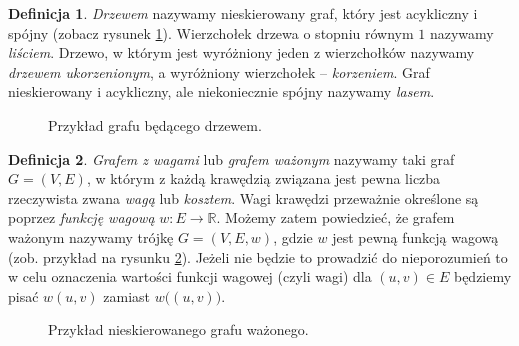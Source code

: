 \documentclass[12pt,a4paper]{book}
\theoremstyle{definition}
\newtheorem{de}{Definicja}[chapter]
\newcommand{\bR}{{\mathbb R}}
\numberwithin{equation}{chapter}
\begin{document}
\begin{de}
\textit{Drzewem} nazywamy nieskierowany graf, który jest acykliczny i spójny (zobacz rysunek \ref{rys_drzewo}). 
Wierzchołek drzewa o stopniu równym $1$ nazywamy \textit{liściem}. Drzewo, w którym jest wyróżniony jeden z wierzchołków nazywamy \textit{drzewem ukorzenionym}, a wyróżniony wierzchołek – \textit{korzeniem}. Graf nieskierowany i acykliczny, ale niekoniecznie spójny nazywamy \textit{lasem}.
\end{de}

\begin{figure}[H]
\centering
{}
\caption{Przykład grafu będącego drzewem.}
\label{rys_drzewo}
\end{figure}

\begin{de}
\textit{Grafem z wagami} lub \textit{grafem ważonym} nazywamy taki graf $G=(V, E)$, w którym z każdą krawędzią związana jest pewna liczba rzeczywista zwana \textit{wagą} lub \textit{kosztem}. Wagi krawędzi przeważnie określone są poprzez \textit{funkcję wagową} $w\colon E\to \bR$. Możemy zatem powiedzieć, że grafem ważonym nazywamy trójkę $G = (V, E, w)$, gdzie $w$ jest pewną funkcją wagową (zob. przykład na rysunku \ref{rys_graf_wa}). Jeżeli nie będzie to prowadzić do nieporozumień to w celu oznaczenia wartości funkcji wagowej (czyli wagi) dla $(u,v)\in E$ będziemy pisać $w(u,v)$ zamiast $w\big((u,v)\big)$.
\end{de}

\begin{figure}[H]
\centering
{}
\caption{Przykład nieskierowanego grafu ważonego.}
\label{rys_graf_wa}
\end{figure}
\end{document}
